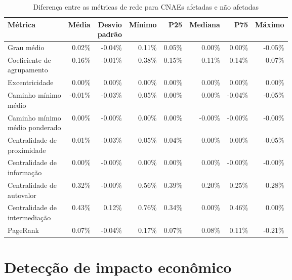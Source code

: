 \begin{table}[htb]
\centering
\caption{Diferença entre as métricas de rede para CNAEs afetadas e não afetadas}
\label{tab:metricas-redes-pandemia:diferenca-afetadas-por-cnae}
\begin{tabular}{l|rrrrrrr}
\toprule
Métrica & Média & \shortstack{Desvio\\padrão} & Mínimo & P25 & Mediana & P75 & Máximo \\
\midrule
Grau médio                     &  0.02\% & -0.04\% & 0.11\% & 0.05\% &  0.00\% &  0.00\% & -0.05\% \\ \hline
\shortstack[l]{Coeficiente de\\agrupamento}     &  0.16\% & -0.01\% & 0.38\% & 0.15\% &  0.11\% &  0.14\% &  0.07\% \\ \hline
Excentricidade                 &  0.00\% &  0.00\% & 0.00\% & 0.00\% &  0.00\% &  0.00\% &  0.00\% \\ \hline
\shortstack[l]{Caminho mínimo\\médio}           & -0.01\% & -0.03\% & 0.05\% & 0.00\% &  0.00\% & -0.04\% & -0.05\% \\ \hline
\shortstack[l]{Caminho mínimo\\médio ponderado} &  0.00\% & -0.00\% & 0.00\% & 0.00\% & -0.00\% & -0.00\% & -0.00\% \\ \hline
\shortstack[l]{Centralidade de\\proximidade}    &  0.01\% & -0.03\% & 0.05\% & 0.04\% &  0.00\% &  0.00\% & -0.05\% \\ \hline
\shortstack[l]{Centralidade de\\informação}     &  0.00\% & -0.00\% & 0.00\% & 0.00\% &  0.00\% & -0.00\% & -0.00\% \\ \hline
\shortstack[l]{Centralidade de\\autovalor}      &  0.32\% & -0.00\% & 0.56\% & 0.39\% &  0.20\% &  0.25\% &  0.28\% \\ \hline
\shortstack[l]{Centralidade de\\intermediação}  &  0.43\% &  0.12\% & 0.76\% & 0.34\% &  0.00\% &  0.46\% &  0.00\% \\ \hline
PageRank                       &  0.07\% & -0.04\% & 0.17\% & 0.07\% &  0.08\% &  0.11\% & -0.21\% \\
\bottomrule
\end{tabular}
\fdadospesquisa
\end{table}

\section{Detecção de impacto econômico}
\label{section:deteccao-impacto}

